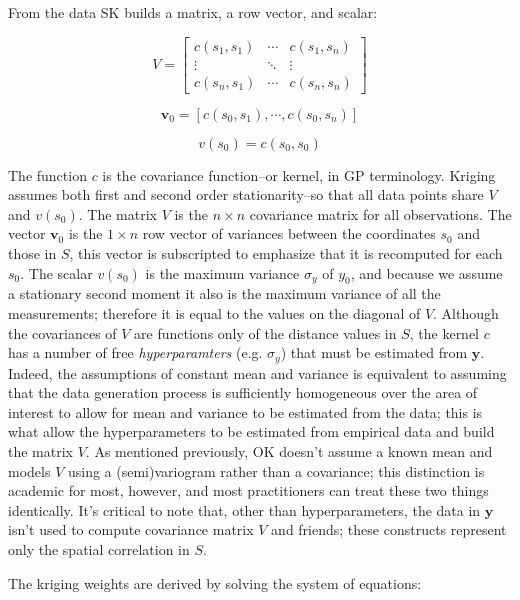 \documentclass[draft]{article}
\begin{document}
From the data SK builds a matrix, a row vector, and scalar:

\[V=
  \begin{bmatrix}
    c(s_1, s_1) & \cdots & c(s_1, s_n) \\
    \vdots      & \ddots & \vdots \\
    c(s_n, s_1) & \cdots & c(s_n, s_n)
  \end{bmatrix}
\]

\[\bm{v}_0=[c(s_0, s_1), \cdots, c(s_0, s_n)]\]

\[v(s_0)=c(s_0, s_0)\]

The function $c$ is the covariance function--or kernel, in GP terminology.  Kriging assumes both first and second order stationarity--so that all data points share $V$ and $v(s_0)$.  The matrix $V$ is the $n \times n$ covariance matrix for all observations.  The vector $\bm{v}_0$ is the $1 \times n$ row vector of variances between the coordinates $s_0$ and those in $S$, this vector is subscripted to emphasize that it is recomputed for each $s_0$.  The scalar $v(s_0)$ is the maximum variance $\sigma_{y}$ of $y_0$, and because we assume a stationary second moment it also is the maximum variance of all the measurements; therefore it is equal to the values on the diagonal of $V$.  Although the covariances of $V$ are functions only of the distance values in $S$, the kernel $c$ has a number of free {\em hyperparamters} (e.g. $\sigma_y$) that must be estimated from $\bm{y}$.  Indeed, the assumptions of constant mean and variance is equivalent to assuming that the data generation process is sufficiently homogeneous over the area of interest to allow for mean and variance to be estimated from the data; this is what allow the hyperparameters to be estimated from empirical data and build the matrix $V$.  As mentioned previously, OK doesn't assume a known mean and models $V$ using a (semi)variogram rather than a covariance; this distinction is academic for most, however, and most practitioners can treat these two things identically.  It's critical to note that, other than hyperparameters, the data in $\bm{y}$ isn't used to compute covariance matrix $V$ and friends; these constructs represent only the spatial correlation in $S$.


The kriging weights are derived by solving the system of equations:
\end{document}
